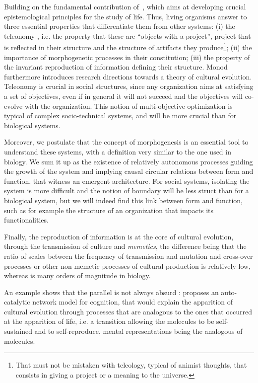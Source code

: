 \documentclass[letterpaper]{article}
\begin{document}
Building on the fundamental contribution of~\cite{monod1970hasard}, which aims at developing crucial epistemological principles for the study of life. Thus, living organisms answer to three essential properties that differentiate them from other systems: (i) the teleonomy , i.e. the property that these are ``objects with a project'', project that is reflected in their structure and the structure of artifacts they produce\footnote{That must not be mistaken with teleology, typical of animist thoughts, that consists in giving a project or a meaning to the universe.}; (ii) the importance of morphogenetic processes in their constitution; (iii) the property of the invariant reproduction of information defining their structure. Monod furthermore introduces research directions towards a theory of cultural evolution. Teleonomy is crucial in social structures, since any organization aims at satisfying a set of objectives, even if in general it will not succeed and the objectives will co-evolve with the organization. This notion of multi-objective optimization is typical of complex socio-technical systems, and will be more crucial than for biological systems.

Moreover, we postulate that the concept of morphogenesis is an essential tool to understand these systems, with a definition very similar to the one used in biology. We sum it up as the existence of relatively autonomous processes guiding the growth of the system and implying causal circular relations between form and function, that witness an emergent architecture. For social systems, isolating the system is more difficult and the notion of boundary will be less struct than for a biological system, but we will indeed find this link between form and function, such as for example the structure of an organization that impacts its functionalities.

Finally, the reproduction of information is at the core of cultural evolution, through the transmission of culture and \emph{memetics}, the difference being that the ratio of scales between the frequency of transmission and mutation and cross-over processes or other non-memetic processes of cultural production is relatively low, whereas is many orders of magnitude in biology.

An example shows that the parallel is not always absurd : \cite{2017arXiv170305917G} proposes an auto-catalytic network model for cognition, that would explain the apparition of cultural evolution through processes that are analogous to the ones that occurred at the apparition of life, i.e. a transition allowing the molecules to be self-sustained and to self-reproduce, mental representations being the analogous of molecules.
\end{document}
